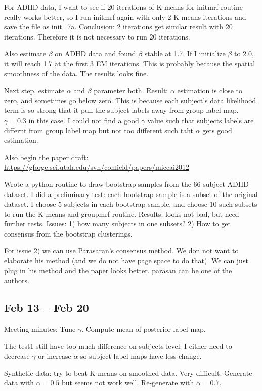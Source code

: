 \documentclass{article}
\begin{document}
For ADHD data, I want to see if 20 iterations of K-means for initmrf routine really works better, so I run initmrf again with only 2 K-means iterations and save the file as init\_7a. Conclusion: 2 iterations get similar result with 20 iterations. Therefore it is not necessary to run 20 iterations.

Also estimate $\beta$ on ADHD data and found $\beta$ stable at 1.7. If I initialize $\beta$ to 2.0, it will reach 1.7 at the first 3 EM iterations. This is probably because the spatial smoothness of the data. The results looks fine.

Next step, estimate $\alpha$ and $\beta$ parameter both. Result: $\alpha$ estimation is close to zero, and sometimes go below zero. This is because each subject's data likelihood term is so strong that it pull the subject labels away from group label map. $\gamma = 0.3$ in this case. I could not find a good $\gamma$ value such that subjects labels are differnt from group label map but not too different such taht $\alpha$ gets good estimation.

Also begin the paper draft: \url{https://gforge.sci.utah.edu/svn/confield/papers/miccai2012}

Wrote a python routine to draw bootstrap samples from the 66 subject ADHD dataset. I did a preliminary test: each bootstrap sample is a subset of the original dataset. I choose 5 subjects in each bootstrap sample, and choose 10 such subsets to run the K-means and groupmrf routine. Results: looks not bad, but need further tests. Issues: 1) how many subjects in one subsets? 2) How to get consensus from the bootstrap clusterings.

For issue 2) we can use Parasaran's consensus method. We don not want to elaborate his method (and we do not have page space to do that). We can just plug in his method and the paper looks better. parasan can be one of the authors.

\subsection{Feb 13 -- Feb 20}
Meeting minutes: Tune $\gamma$. Compute mean of posterior label map. 

The test1 still have too much difference on subjects level. I either need to decrease $\gamma$ or increase $\alpha$ so subject label maps have less change.

Synthetic data: try to beat K-means on smoothed data. Very difficult. Generate data with $\alpha=0.5$ but seems not work well. Re-generate with $\alpha=0.7$.
\end{document}
